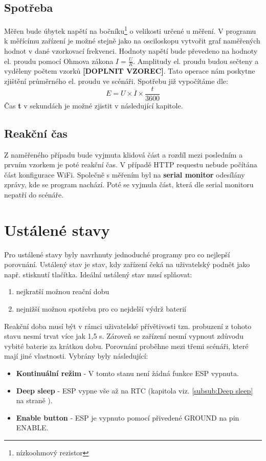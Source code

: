 \documentclass[a4paper, 12pt]{report}
\begin{document}
				\subsection{Spotřeba} \label{metodika:wifi spotreba}
					Měřen bude úbytek napětí na bočníku\footnote{nízkoohmový rezistor} o velikosti určené u měření. V programu k měřícímu zařízení je možné stejně jako na osciloskopu vytvořit graf naměřených hodnot v dané vzorkovací frekvenci. Hodnoty napětí bude převedeno na hodnoty el. proudu pomocí Ohmova zákona $I = \frac{U}{R}$. Amplitudy el. proudu budou sečteny a vyděleny počtem vzorků {\bf[DOPLNIT VZOREC]}. Tato operace nám poskytne zjištění průměrného el. proudu ve scénáři. Spotřebu již vypočítáme dle:
					$$E = U \times \overline{I} \times \frac{t}{3600}$$
					Čas {\bf t} v sekundách je možné zjistit v následující kapitole.
				\subsection{Reakční čas} \label{metodika:wifi reakce}
					Z naměřeného případu bude vyjmuta klidová část a rozdíl mezi posledním a prvním vzorkem je poté reakční čas. V případě HTTP requestu nebude počítána část konfigurace WiFi. Společně s měřením byl na {\bf serial monitor} odesílány zprávy, kde se program nachází. Poté se vyjmula část, která dle serial monitoru nepatří do scénáře.

			\section{Ustálené stavy}
				Pro ustálené stavy byly navrhnuty jednoduché programy pro co nejlepší porovnání. Ustálený stav je stav, kdy zařízení čeká na uživatelský podnět jako např. stisknutí tlačítka. Ideální ustálený stav musí splňovat:
				\begin{enumerate}
					\item nejkratší možnou reační dobu
					\item nejnižší možnou spotřebu pro co nejdelší výdrž baterií
				\end{enumerate}
				Reakční doba musí být v rámci uživatelské přívětivosti tzn. probuzení z tohoto stavu nesmí trvat více jak 1,5 \si{s}. Zároveň se zařízení nesmí vypnout zdůvodu vybité baterie za krátkou dobu. Porovnání proběhne mezi třemi scénáři, které mají jiné vlastnosti. Vybrány byly následující:
				\begin{itemize}
					\item {\bf Kontinuální režim} - V tomto stanu není žádná funkce ESP vypnuta.
					\item {\bf Deep sleep} - ESP vypne vše až na RTC (kapitola viz. \ref{subsub:Deep sleep} na straně \pageref{subsub:Deep sleep}).
					\item {\bf Enable button} - ESP je vypnuto pomocí přivedené GROUND na pin ENABLE.
				\end{itemize}
\end{document}
